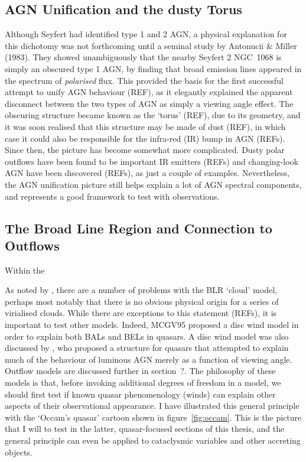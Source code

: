 \subsection{AGN Unification and the dusty Torus}

Although Seyfert had identified type 1 and 2 AGN, a physical explanation
for this dichotomy was not forthcoming until a seminal study by Antonucii \& Miller (1983).
They showed unambiguously that the nearby Seyfert 2 NGC~1068 is simply an obscured
type 1 AGN, by finding that broad emission lines appeared in the spectrum of
{\em polarised} flux. This provided the basis for the first successful attempt
to unify AGN behaviour (REF), as it elegantly explained the apparent disconnect between
the two types of AGN as simply a viewing angle effect. The obscuring structure became known as 
the `torus' (REF), due to its geometry, and it was soon realised that this structure
may be made of dust (REF), in which case it could also be responsible for the infra-red (IR)
bump in AGN (REFs). Since then, the picture has become somewhat more complicated. Dusty polar outflows
have been found to be important IR emitters (REFs) and changing-look 
AGN have been discovered (REFs), as just a couple of examples.
Nevertheless, the AGN unification picture still helps explain a lot of AGN spectral components,
and represents a good framework to test with observations. 

\subsection{The Broad Line Region and Connection to Outflows}

Within the 

As noted by \cite[][hereafter MCGC95]{MCGV95}, there are a number of problems with
the BLR `cloud' model, perhaps most notably that there is no obvious 
physical origin for a series of virialised clouds. While there are exceptions
to this statement (REFs), it is important to test other models.
Indeed, MCGV95 proposed a disc wind model in order to explain both BALs and BELs
in quasars. A disc wind model was also  discussed by \cite{elvis2000}, 
who proposed a structure for quasars that attempted to explain much 
of the behaviour of luminous AGN
merely as a function of viewing angle. Outflow models are discussed further in section~?.
The philosophy of these models is that, before invoking additional
degrees of freedom in a model, we should first test if known quasar phenomenology 
(winds) can explain other aspects of their observational appearance.
I have illustrated this general principle with the `Occam's quasar' 
cartoon shown in figure~\ref{fig:occam}. This is the picture that I will
to test in the latter, quasar-focused sections of this thesis, and the general
principle can even be applied to cataclysmic variables and other accreting objects.


